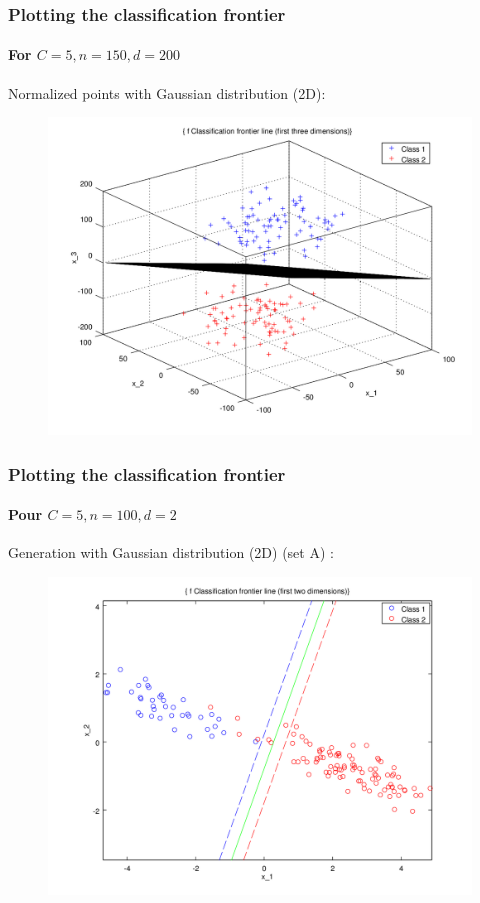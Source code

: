 \documentclass{beamer}
\begin{document}
\begin{frame}
\frametitle{Plotting the \textbf{classification frontier}}
\framesubtitle{For $C = 5, n = 150, d = 200$}

Normalized points with Gaussian distribution (2D):

         \begin{figure}
         \centering
         \includegraphics[scale=0.4]{images/plane4.png}
         \end{figure}

\end{frame}

\begin{frame}
\frametitle{Plotting the \textbf{classification frontier}}
\framesubtitle{Pour $C = 5, n = 100, d = 2$}

Generation with Gaussian distribution (2D) (set A) :

         \begin{figure}
         \centering
         \includegraphics[scale=0.4]{images/image1.png}
         \end{figure}

\end{frame}
\end{document}
